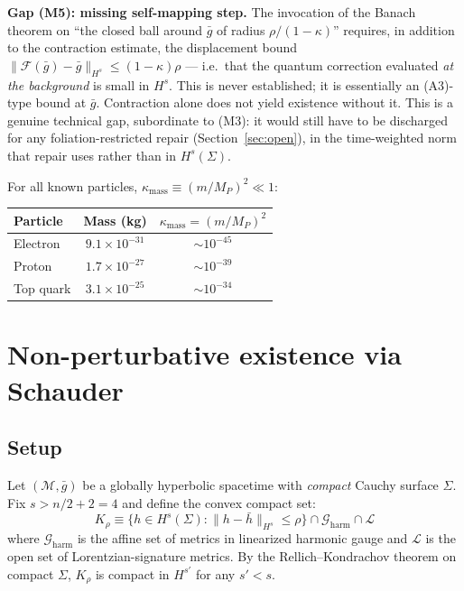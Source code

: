 \documentclass[12pt,a4paper]{article}
\begin{document}
\smallskip\noindent\textbf{Gap (M5): missing self-mapping step.}
The invocation of the Banach theorem on ``the closed ball around $\bar{g}$ of radius
$\rho/(1-\kappa)$'' requires, in addition to the contraction estimate, the displacement
bound $\|\mathcal{F}(\bar{g}) - \bar{g}\|_{H^s} \leq (1-\kappa)\rho$ --- i.e.\ that the
quantum correction evaluated \emph{at the background} is small in $H^s$. This is never
established; it is essentially an (A3)-type bound at $\bar{g}$. Contraction alone does
not yield existence without it. This is a genuine technical gap, subordinate to (M3): it
would still have to be discharged for any foliation-restricted repair (Section~\ref{sec:open}),
in the time-weighted norm that repair uses rather than in $H^s(\Sigma)$.

\medskip

For all known particles, $\kappa_{\text{mass}} \equiv (m/M_P)^2 \ll 1$:
\begin{center}
\begin{tabular}{lcc}
\toprule
Particle & Mass (kg) & $\kappa_{\text{mass}} = (m/M_P)^2$ \\
\midrule
Electron & $9.1\times10^{-31}$ & $\sim 10^{-45}$ \\
Proton & $1.7\times10^{-27}$ & $\sim 10^{-39}$ \\
Top quark & $3.1\times10^{-25}$ & $\sim 10^{-34}$ \\
\bottomrule
\end{tabular}
\end{center}

\section{Non-perturbative existence via Schauder}
\label{sec:schauder}

\subsection{Setup}

Let $(\mathcal{M},\bar{g})$ be a globally hyperbolic spacetime with \emph{compact} Cauchy
surface $\Sigma$. Fix $s > n/2 + 2 = 4$ and define the convex compact set:
\begin{equation}
K_\rho \equiv \bigl\{h \in H^s(\Sigma) : \|h-\bar{h}\|_{H^s} \leq \rho\bigr\}
\cap \mathcal{G}_{\text{harm}} \cap \mathcal{L}
\label{eq:K_rho}
\end{equation}
where $\mathcal{G}_{\text{harm}}$ is the affine set of metrics in linearized harmonic
gauge and $\mathcal{L}$ is the open set of Lorentzian-signature metrics. By the
Rellich--Kondrachov theorem on compact $\Sigma$, $K_\rho$ is compact in $H^{s'}$ for
any $s' < s$.
\end{document}

